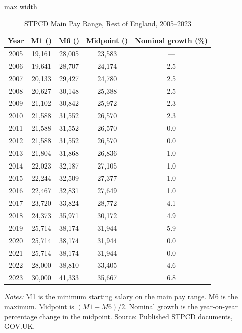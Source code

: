 \documentclass[12pt]{article}
\begin{document}
\begin{table}[H]
\centering
\caption{STPCD Main Pay Range, Rest of England, 2005--2023}
\label{tab:stpcd}
\begin{adjustbox}{max width=\textwidth}
\begin{threeparttable}
\begin{tabular}{ccccc}
\toprule
Year & M1 (\textsterling{}) & M6 (\textsterling{}) & Midpoint (\textsterling{}) & Nominal growth (\%) \\
\midrule
2005 & 19,161 & 28,005 & 23,583 & --- \\
2006 & 19,641 & 28,707 & 24,174 & 2.5 \\
2007 & 20,133 & 29,427 & 24,780 & 2.5 \\
2008 & 20,627 & 30,148 & 25,388 & 2.5 \\
2009 & 21,102 & 30,842 & 25,972 & 2.3 \\
2010 & 21,588 & 31,552 & 26,570 & 2.3 \\
2011 & 21,588 & 31,552 & 26,570 & 0.0 \\
2012 & 21,588 & 31,552 & 26,570 & 0.0 \\
2013 & 21,804 & 31,868 & 26,836 & 1.0 \\
2014 & 22,023 & 32,187 & 27,105 & 1.0 \\
2015 & 22,244 & 32,509 & 27,377 & 1.0 \\
2016 & 22,467 & 32,831 & 27,649 & 1.0 \\
2017 & 23,720 & 33,824 & 28,772 & 4.1 \\
2018 & 24,373 & 35,971 & 30,172 & 4.9 \\
2019 & 25,714 & 38,174 & 31,944 & 5.9 \\
2020 & 25,714 & 38,174 & 31,944 & 0.0 \\
2021 & 25,714 & 38,174 & 31,944 & 0.0 \\
2022 & 28,000 & 38,810 & 33,405 & 4.6 \\
2023 & 30,000 & 41,333 & 35,667 & 6.8 \\
\bottomrule
\end{tabular}
\begin{tablenotes}[flushleft]
\small
\item \textit{Notes:} M1 is the minimum starting salary on the main pay range. M6 is the maximum. Midpoint is $(M1 + M6)/2$. Nominal growth is the year-on-year percentage change in the midpoint. Source: Published STPCD documents, GOV.UK.
\end{tablenotes}
\end{threeparttable}
\end{adjustbox}
\end{table}
\end{document}

